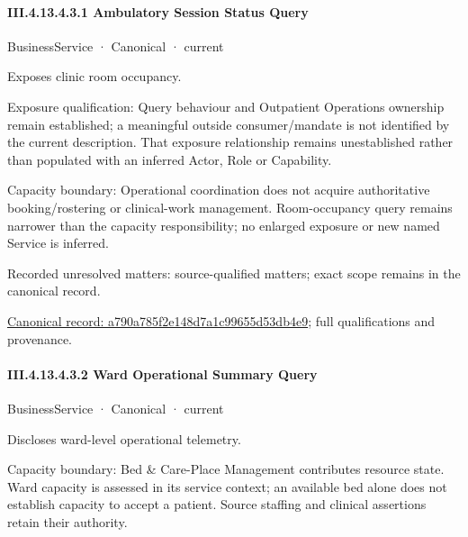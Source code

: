 \paragraph*{III.4.13.4.3.1 Ambulatory Session Status Query}
\label{navigation:III.4.13.4.3.1}

\label{element:a790a785f2e148d7a1c99655d53db4e9}
{\small BusinessService · Canonical · current}\par

Exposes clinic room occupancy.



Exposure qualification: Query behaviour and Outpatient Operations ownership remain established; a meaningful outside consumer/mandate is not identified by the current description. That exposure relationship remains unestablished rather than populated with an inferred Actor, Role or Capability.



Capacity boundary: Operational coordination does not acquire authoritative booking/rostering or clinical-work management. Room-occupancy query remains narrower than the capacity responsibility; no enlarged exposure or new named Service is inferred.


{\small Recorded unresolved matters: source-qualified matters; exact scope remains in the canonical record.}\par
{\footnotesize \href{../../../../../../../../continuum/business/business-service/a790a785f2e148d7a1c99655d53db4e9.md}{Canonical record: a790a785f2e148d7a1c99655d53db4e9}; full qualifications and provenance.}\par
\paragraph*{III.4.13.4.3.2 Ward Operational Summary Query}
\label{navigation:III.4.13.4.3.2}

\label{element:55a7f84dfb4142e2aa96c5253b4b6394}
{\small BusinessService · Canonical · current}\par

Discloses ward-level operational telemetry.



Capacity boundary: Bed \& Care-Place Management contributes resource state. Ward capacity is assessed in its service context; an available bed alone does not establish capacity to accept a patient. Source staffing and clinical assertions retain their authority.


